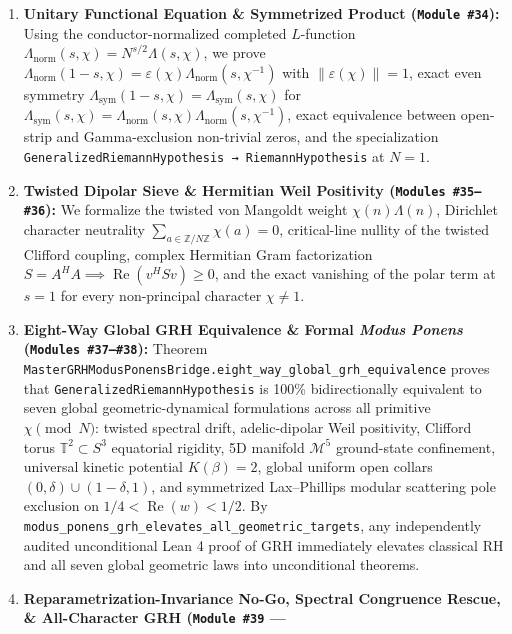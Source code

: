 \documentclass[
  11pt,
]{article}
\providecommand{\tightlist}{%
  \setlength{\itemsep}{0pt}\setlength{\parskip}{0pt}}
\begin{document}
\begin{enumerate}
\def\labelenumi{\arabic{enumi}.}
\tightlist
\item
  \textbf{Unitary Functional Equation \& Symmetrized Product
  (\texttt{Module\ \#34}):} Using the conductor-normalized completed
  \(L\)-function
  \(\Lambda_{\text{norm}}(s, \chi) = N^{s/2}\Lambda(s, \chi)\), we prove
  \(\Lambda_{\text{norm}}(1-s, \chi) = \varepsilon(\chi)\Lambda_{\text{norm}}(s, \chi^{-1})\)
  with \(\|\varepsilon(\chi)\| = 1\), exact even symmetry
  \(\Lambda_{\text{sym}}(1-s, \chi) = \Lambda_{\text{sym}}(s, \chi)\)
  for
  \(\Lambda_{\text{sym}}(s,\chi) = \Lambda_{\text{norm}}(s,\chi)\Lambda_{\text{norm}}(s,\chi^{-1})\),
  exact equivalence between open-strip and Gamma-exclusion non-trivial
  zeros, and the specialization
  \texttt{GeneralizedRiemannHypothesis\ →\ RiemannHypothesis} at
  \(N = 1\).
\item
  \textbf{Twisted Dipolar Sieve \& Hermitian Weil Positivity
  (\texttt{Modules\ \#35–\#36}):} We formalize the twisted von Mangoldt
  weight \(\chi(n)\Lambda(n)\), Dirichlet character neutrality
  \(\sum_{a\in\mathbb{Z}/N\mathbb{Z}}\chi(a)=0\), critical-line nullity
  of the twisted Clifford coupling, complex Hermitian Gram factorization
  \(S = A^H A \implies \operatorname{Re}(v^H S v) \ge 0\), and the exact
  vanishing of the polar term at \(s=1\) for every non-principal
  character \(\chi \ne 1\).
\item
  \textbf{Eight-Way Global GRH Equivalence \& Formal \emph{Modus Ponens}
  (\texttt{Modules\ \#37–\#38}):} Theorem
  \texttt{MasterGRHModusPonensBridge.eight\_way\_global\_grh\_equivalence}
  proves that \texttt{GeneralizedRiemannHypothesis} is 100\%
  bidirectionally equivalent to seven global geometric-dynamical
  formulations across all primitive \(\chi \pmod N\): twisted spectral
  drift, adelic-dipolar Weil positivity, Clifford torus
  \(\mathbb{T}^2 \subset S^3\) equatorial rigidity, 5D manifold
  \(\mathcal{M}^5\) ground-state confinement, universal kinetic
  potential \(K(\beta)=2\), global uniform open collars
  \((0,\delta)\cup(1-\delta,1)\), and symmetrized Lax--Phillips modular
  scattering pole exclusion on \(1/4 < \operatorname{Re}(w) < 1/2\). By
  \texttt{modus\_ponens\_grh\_elevates\_all\_geometric\_targets}, any
  independently audited unconditional Lean 4 proof of GRH immediately
  elevates classical RH and all seven global geometric laws into
  unconditional theorems.
\item
  \textbf{Reparametrization-Invariance No-Go, Spectral Congruence
  Rescue, \& All-Character GRH (\texttt{Module\ \#39} ---
}
\end{enumerate}
\end{document}
